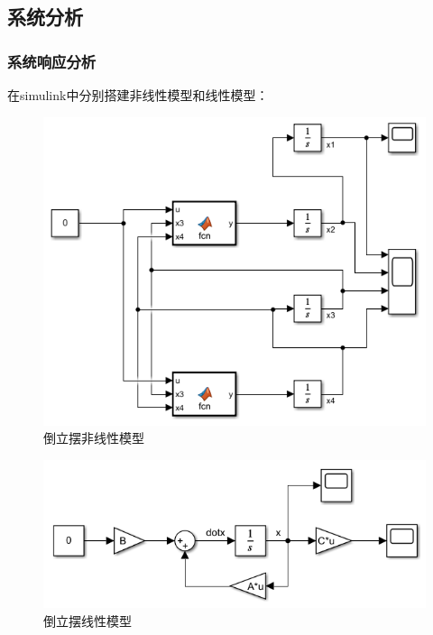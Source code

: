 \documentclass[UTF8]{article}
\begin{document}
\subsection{系统分析}
\subsubsection{系统响应分析}
在simulink中分别搭建非线性模型和线性模型：
\begin{figure}[H]
    \centering %
    \includegraphics[width=.6\textwidth]{figure/倒立摆-非线性模型.png} 
    \caption{倒立摆非线性模型} %
\end{figure}
\begin{figure}[H]
    \centering %
    \includegraphics[width=.6\textwidth]{figure/倒立摆-线性模型.png} 
    \caption{倒立摆线性模型} %
\end{figure}
\end{document}
